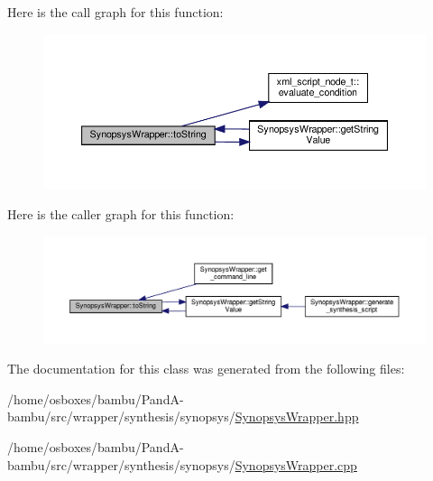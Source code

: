 Here is the call graph for this function\+:
\nopagebreak
\begin{figure}[H]
\begin{center}
\leavevmode
\includegraphics[width=350pt]{d7/d59/classSynopsysWrapper_abdd13f9bc68c225978b5a29ac6250df2_cgraph}
\end{center}
\end{figure}
Here is the caller graph for this function\+:
\nopagebreak
\begin{figure}[H]
\begin{center}
\leavevmode
\includegraphics[width=350pt]{d7/d59/classSynopsysWrapper_abdd13f9bc68c225978b5a29ac6250df2_icgraph}
\end{center}
\end{figure}


The documentation for this class was generated from the following files\+:\begin{DoxyCompactItemize}
\item 
/home/osboxes/bambu/\+Pand\+A-\/bambu/src/wrapper/synthesis/synopsys/\hyperlink{SynopsysWrapper_8hpp}{Synopsys\+Wrapper.\+hpp}\item 
/home/osboxes/bambu/\+Pand\+A-\/bambu/src/wrapper/synthesis/synopsys/\hyperlink{SynopsysWrapper_8cpp}{Synopsys\+Wrapper.\+cpp}\end{DoxyCompactItemize}
